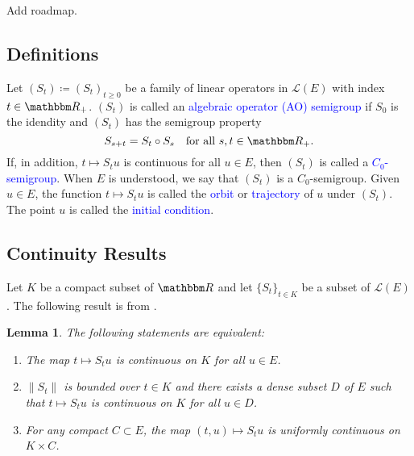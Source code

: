 \documentclass[12pt, reqno]{amsart}
\renewcommand{\geq}{\geqslant}
\newcommand{\1}{\mathbbm 1}
\newcommand{\lL}{\mathcal L}
\newcommand{\RR}{\mathbbm R}
\theoremstyle{plain}
\newtheorem{lemma}[theorem]{Lemma}
\theoremstyle{definition}
\newcommand{\navy}[1]{\textcolor{blue}{#1}}
\begin{document}
Add roadmap.

\subsection{Definitions}

Let $(S_t) \coloneq (S_t)_{t \geq 0}$ be a family of
linear operators in $\lL(E)$ with index $t \in \RR_+$. $(S_t)$ is called 
an \navy{algebraic operator (AO) semigroup} if 
$S_0$ is the idendity and $(S_t)$ has the semigroup property
%
\begin{equation*}
    S_{s + t} = S_t \circ S_s
    \quad \text{for all } s, t \in \RR_+.
\end{equation*}
%
If, in addition, $t \mapsto S_t u$ is continuous for all $u \in E$, then $(S_t)$
is called a \navy{$C_0$-semigroup}.  When $E$ is understood, we say that $(S_t)$
is a $C_0$-semigroup. Given $u \in E$, the function $t \mapsto S_t u$ is
called the \navy{orbit} or \navy{trajectory} of $u$ under $(S_t)$.
The point $u$ is called the \navy{initial condition}.



\subsection{Continuity Results}


Let $K$ be a compact subset of $\RR$ and let $\{S_t\}_{t \in K}$ be a subset of
$\lL(E)$.  The following result is from \cite{engel2006short}.

\begin{lemma}\label{l:contin}
    The following statements are equivalent:
    \begin{enumerate}
        \item The map $t \mapsto S_t u$ is continuous on $K$ for all $u \in E$.
        \item $\|S_t\|$ is bounded over $t \in K$ and there exists a dense subset
            $D$ of $E$ such that $t \mapsto S_t u$ is continuous on $K$ for all $u \in D$.
        \item For any compact $C \subset E$, the map $(t, u) \mapsto S_t u$ is
            uniformly continuous on $K \times C$.
    \end{enumerate}
\end{lemma}
\end{document}

